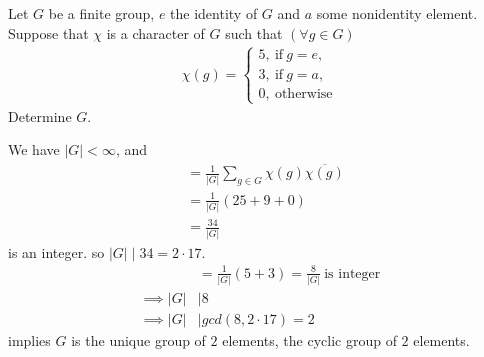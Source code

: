 \documentclass{article}
\begin{document}
\pagebreak

\begin{homeworkProblem}
    Let $G$ be a finite group, $e$ the identity of $G$
    and $a$ some nonidentity element. Suppose that $\chi$
    is a character of $G$ such that $(\forall g \in G)$
    \begin{align}
        \chi (g) = 
        \begin{cases}
            5, \ \text{if} \ g=e,\\
            3, \ \text{if} \ g = a,\\
            0, \ \text{otherwise}
        \end{cases}
    \end{align}
    Determine $G$.\\
    \solution

    We have $\lvert G \rvert < \infty$, and
    \begin{align}
        [\chi, \chi] &= \frac{ 1 }{ \lvert G \rvert } \sum_{g \in G} 
        \chi(g) \overline{\chi(g)}\\
        &= \frac{ 1 }{ \lvert G \rvert }(25+9+0)\\
        &= \frac{ 34 }{ \lvert G \rvert }
    \end{align}
    is an integer. so $\lvert G \rvert \mid 34 = 2 \cdot 17$.\\
    \begin{align}
        [\chi, \mathbb{1}_G] &= \frac{ 1 }{ \lvert G \rvert }(5+3)
        = \frac{ 8 }{ \lvert G \rvert } \ \text{is integer}\\
        \implies \lvert G \rvert &\mid 8\\
        \implies \lvert G \rvert &\mid gcd(8, 2 \cdot 17) = 2
    \end{align}
    implies $G$ is the unique group of $2$ elements,
    the cyclic group of $2$ elements.

    
    


    
    
\end{homeworkProblem}
\end{document}
